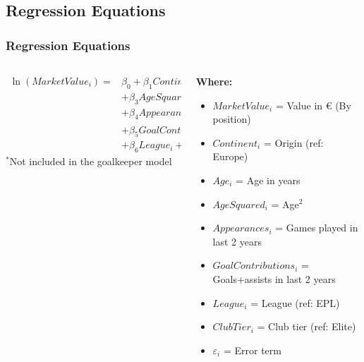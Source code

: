 \documentclass[t,aspectratio=169,xcolor=dvipsnames]{beamer}
\begin{document}
\subsection{Regression Equations}
\begin{frame}
    \frametitle{Regression Equations}
    
    \begin{columns}[T]
        \begin{column}{0.58\textwidth}
            \begin{equation}
            \begin{split}
            \ln(MarketValue_i) = & \beta_0 + \beta_1 Continent_i + \beta_2 Age_i \\
                                 & + \beta_3 AgeSquared_i \\
                                 & + \beta_4 Appearances_i \\
                                 & + \beta_5 GoalContributions_i^* \\
                                 & + \beta_6 League_i + \beta_7 ClubTier_i + \varepsilon_i
            \end{split}
            \end{equation}
            \vspace{-0.3cm}
            {\footnotesize $^*$Not included in the goalkeeper model}
        \end{column}
        
        \begin{column}{0.42\textwidth}
            \vspace{0.1cm}
            \footnotesize
            \textbf{Where:}
            \begin{itemize}
                \item $MarketValue_i$ = Value in € (By position)
                \item $Continent_i$ = Origin (ref: Europe)
                \item $Age_i$ = Age in years
                \item $AgeSquared_i$ = Age$^2$
                \item $Appearances_i$ = Games played in last 2 years
                \item $GoalContributions_i$ = Goals+assists in last 2 years
                \item $League_i$ = League (ref: EPL)
                \item $ClubTier_i$ = Club tier (ref: Elite)
                \item $\varepsilon_i$ = Error term
            \end{itemize}
        \end{column}
    \end{columns}
\end{frame}
\end{document}
